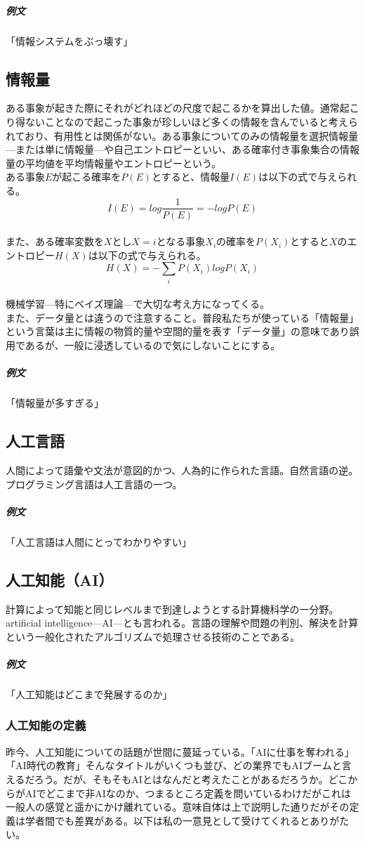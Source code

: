 \documentclass[dvipdfmx,jb5]{jreport}
\begin{document}
\subparagraph{例文}「情報システムをぶっ壊す」

\subsection{情報量}
ある事象が起きた際にそれがどれほどの尺度で起こるかを算出した値。通常起こり得ないことなので起こった事象が珍しいほど多くの情報を含んでいると考えられており、有用性とは関係がない。ある事象についてのみの情報量を選択情報量---または単に情報量---や自己エントロピーといい、ある確率付き事象集合の情報量の平均値を平均情報量やエントロピーという。
\\

ある事象$E$が起こる確率を$P(E)$とすると、情報量$I(E)$は以下の式で与えられる。\[
      I(E) = log{\frac{1}{P(E)}} = -log{P(E)}
\]\\
また、ある確率変数を$X$とし$X=i$となる事象$X_i$の確率を$P(X_i)$とすると$X$のエントロピー$H(X)$は以下の式で与えられる。\[
      H(X) = -\sum_{i} P(X_i) log{P(X_i)}
\]\\
機械学習---特にベイズ理論---で大切な考え方になってくる。
\\

また、データ量とは違うので注意すること。普段私たちが使っている「情報量」という言葉は主に情報の物質的量や空間的量を表す「データ量」の意味であり誤用であるが、一般に浸透しているので気にしないことにする。

\subparagraph{例文}「情報量が多すぎる」


\subsection{人工言語}
人間によって語彙や文法が意図的かつ、人為的に作られた言語。自然言語の逆。プログラミング言語は人工言語の一つ。

\subparagraph{例文}「人工言語は人間にとってわかりやすい」

\subsection{人工知能（AI）}
計算によって知能と同じレベルまで到達しようとする計算機科学の一分野。artificial intelligence---AI---とも言われる。言語の理解や問題の判別、解決を計算という一般化されたアルゴリズムで処理させる技術のことである。

\subparagraph{例文}「人工知能はどこまで発展するのか」

\subsubsection{人工知能の定義}
昨今、人工知能についての話題が世間に蔓延っている。「AIに仕事を奪われる」「AI時代の教育」そんなタイトルがいくつも並び、どの業界でもAIブームと言えるだろう。だが、そもそもAIとはなんだと考えたことがあるだろうか。どこからがAIでどこまで非AIなのか、つまるところ定義を問いているわけだがこれは一般人の感覚と遥かにかけ離れている。意味自体は上で説明した通りだがその定義は学者間でも差異がある。以下は私の一意見として受けてくれるとありがたい。
\\
\end{document}
